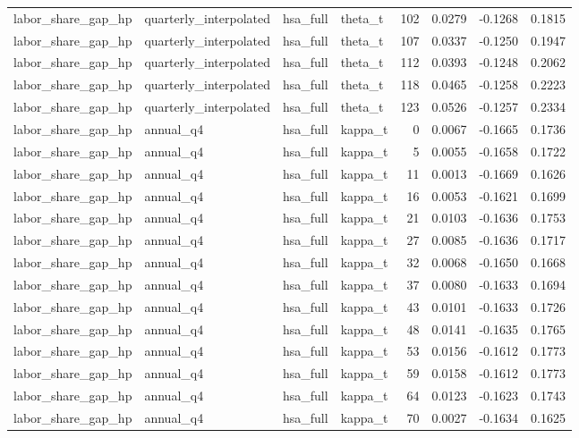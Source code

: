 \begin{tabular}{llllrrrr}
labor\_share\_gap\_hp & quarterly\_interpolated & hsa\_full & theta\_t & 102 & 0.0279 & -0.1268 & 0.1815 \\
labor\_share\_gap\_hp & quarterly\_interpolated & hsa\_full & theta\_t & 107 & 0.0337 & -0.1250 & 0.1947 \\
labor\_share\_gap\_hp & quarterly\_interpolated & hsa\_full & theta\_t & 112 & 0.0393 & -0.1248 & 0.2062 \\
labor\_share\_gap\_hp & quarterly\_interpolated & hsa\_full & theta\_t & 118 & 0.0465 & -0.1258 & 0.2223 \\
labor\_share\_gap\_hp & quarterly\_interpolated & hsa\_full & theta\_t & 123 & 0.0526 & -0.1257 & 0.2334 \\
labor\_share\_gap\_hp & annual\_q4 & hsa\_full & kappa\_t & 0 & 0.0067 & -0.1665 & 0.1736 \\
labor\_share\_gap\_hp & annual\_q4 & hsa\_full & kappa\_t & 5 & 0.0055 & -0.1658 & 0.1722 \\
labor\_share\_gap\_hp & annual\_q4 & hsa\_full & kappa\_t & 11 & 0.0013 & -0.1669 & 0.1626 \\
labor\_share\_gap\_hp & annual\_q4 & hsa\_full & kappa\_t & 16 & 0.0053 & -0.1621 & 0.1699 \\
labor\_share\_gap\_hp & annual\_q4 & hsa\_full & kappa\_t & 21 & 0.0103 & -0.1636 & 0.1753 \\
labor\_share\_gap\_hp & annual\_q4 & hsa\_full & kappa\_t & 27 & 0.0085 & -0.1636 & 0.1717 \\
labor\_share\_gap\_hp & annual\_q4 & hsa\_full & kappa\_t & 32 & 0.0068 & -0.1650 & 0.1668 \\
labor\_share\_gap\_hp & annual\_q4 & hsa\_full & kappa\_t & 37 & 0.0080 & -0.1633 & 0.1694 \\
labor\_share\_gap\_hp & annual\_q4 & hsa\_full & kappa\_t & 43 & 0.0101 & -0.1633 & 0.1726 \\
labor\_share\_gap\_hp & annual\_q4 & hsa\_full & kappa\_t & 48 & 0.0141 & -0.1635 & 0.1765 \\
labor\_share\_gap\_hp & annual\_q4 & hsa\_full & kappa\_t & 53 & 0.0156 & -0.1612 & 0.1773 \\
labor\_share\_gap\_hp & annual\_q4 & hsa\_full & kappa\_t & 59 & 0.0158 & -0.1612 & 0.1773 \\
labor\_share\_gap\_hp & annual\_q4 & hsa\_full & kappa\_t & 64 & 0.0123 & -0.1623 & 0.1743 \\
labor\_share\_gap\_hp & annual\_q4 & hsa\_full & kappa\_t & 70 & 0.0027 & -0.1634 & 0.1625 \\

\end{tabular}

